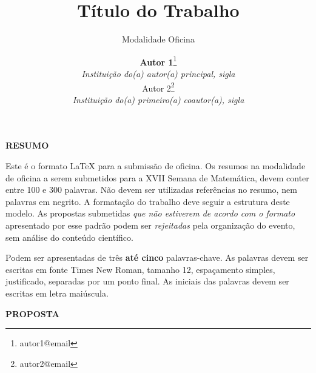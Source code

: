 \documentclass{semat}
\begin{document}

\title{\textbf{Título do Trabalho}}
\subtitle{Modalidade Oficina} %

\author{
    {\large \textbf {Autor 1}}\thanks{autor1@email}\\ 
    {\small \textit{Instituição do(a) autor(a) principal, sigla}} \\
    {\large Autor 2}\thanks{autor2@email}\\
    {\small \textit{Instituição do(a) primeiro(a) coautor(a), sigla}} 
}
\criartitulo

\begin{center}
\textbf{RESUMO}
\end{center}
\noindent Este é o formato \LaTeX{} para a submissão de oficina. Os resumos na modalidade de oficina a serem submetidos para a XVII Semana de Matemática, devem conter entre 100 e 300 palavras. Não devem ser utilizadas referências no resumo, nem palavras em negrito. A formatação do trabalho deve seguir a estrutura deste modelo. As propostas submetidas \emph{que não estiverem de acordo com o formato} apresentado por esse padrão podem ser \emph{rejeitadas} pela organização do evento, sem análise do conteúdo científico.
\vspace{1.5em}

 Podem ser apresentadas de três \textbf{até cinco} palavras-chave. As palavras devem ser escritas em fonte Times New Roman, tamanho 12, espaçamento simples, justificado, separadas por um ponto final. As iniciais das palavras devem ser escritas em letra maiúscula.
\vspace{1.5em}


\vspace{1.5em}
\begin{center}
\textbf{PROPOSTA}
\end{center}
\end{document}
